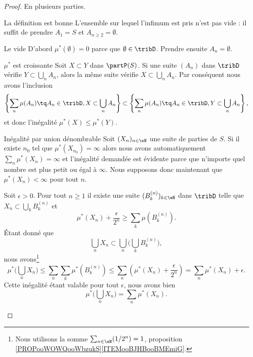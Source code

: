 \begin{proof}
	En plusieurs parties.
	\begin{subproof}
		\item[La définition est bonne]
		L'ensemble sur lequel l'infimum est pris n'est pas vide : il suffit de prendre \( A_1=S\) et \( A_{n\geq 2}=\emptyset\).
		\item[Le vide]
		D'abord \( \mu^*(\emptyset)=0\) parce que \( \emptyset\in\tribD\). Prendre ensuite \( A_n=\emptyset\).
		\item[\( \mu^*\) est croissante]
		Soit \( X\subset Y\) dans \( \partP(S)\). Si une suite \( (A_n)\) dans \( \tribD\) vérifie \( Y\subset \bigcup_nA_n\), alors la même suite vérifie \( X\subset\bigcup_nA_n\). Par conséquent nous avons l'inclusion
		\begin{equation}
			\left\{ \sum_n\mu(A_n)\tq A_n\in\tribD,X\subset\bigcup_nA_n \right\} \subset\left\{ \sum_n\mu(A_n)\tq A_n\in\tribD,Y\subset\bigcup_nA_n \right\} ,
		\end{equation}
		et donc l'inégalité \( \mu^*(X)\leq \mu^*(Y)\).
		\item[Inégalité par union dénombrable]
		Soit \( (X_n)_{n\in \eN}\) une suite de parties de \( S\). Si il existe \( n_0\) tel que \( \mu^*(X_{n_0})=\infty\) alors nous avons automatiquement \( \sum_n\mu^*(X_n)=\infty\) et l'inégalité demandée est évidente parce que n'importe quel nombre est plus petit ou égal à \( \infty\). Nous supposons donc maintenant que \( \mu^*(X_n)<\infty\) pour tout \( n\).

		Soit \( \epsilon>0\). Pour tout \( n\geq 1\) il existe une suite \( (B_k^{(n)})_{k\in \eN}\) dans \( \tribD\) telle que \( X_n\subset\bigcup_kB_k^{(n)}\) et
		\begin{equation}
			\mu^*(X_n)+\frac{ \epsilon }{ 2^n }\geq \sum_k\mu(B_k^{(n)}).
		\end{equation}
		Étant donné que
		\begin{equation}
			\bigcup_nX_n\subset\bigcup_n\big( \bigcup_kB_k^{(n)} \big),
		\end{equation}
		nous avons\footnote{Nous utilisons la somme \( \sum_{n\in \eN}(1/2^n)=1\), proposition \ref{PROPooWOWQooWbzukS}\ref{ITEMooBJHBooBMEmiG}.}
		\begin{equation}
			\mu^*\big( \bigcup_nX_n \big)\leq \sum_n\sum_k\mu^*(B_k^{(n)})\leq \sum_n\left( \mu^*(X_n)+\frac{ \epsilon }{ 2^n } \right)=\sum_n\mu^*(X_n)+\epsilon.
		\end{equation}
		Cette inégalité étant valable pour tout \( \epsilon\), nous avons bien
		\begin{equation}
			\mu^*\big( \bigcup_nX_n \big)=\sum_n\mu^*(X_n).
		\end{equation}


\end{subproof}
\end{proof}
